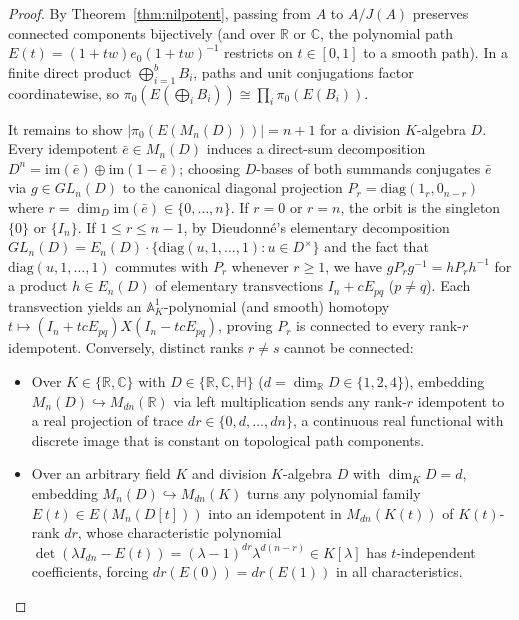 \documentclass[11pt,a4paper]{article}
\theoremstyle{definition}
\newcommand{\R}{\mathbb{R}}
\newcommand{\C}{\mathbb{C}}
\newcommand{\HH}{\mathbb{H}}
\begin{document}
\begin{proof}
By Theorem~\ref{thm:nilpotent}, passing from $A$ to $A/J(A)$ preserves connected components
bijectively (and over $\R$ or $\C$, the polynomial path $E(t)=(1+tw)e_0(1+tw)^{-1}$ restricts
on $t\in[0,1]$ to a smooth path). In a finite direct product $\bigoplus_{i=1}^b B_i$, paths
and unit conjugations factor coordinatewise, so $\pi_0(E(\bigoplus_i B_i))\cong\prod_i\pi_0(E(B_i))$.

It remains to show $|\pi_0(E(M_n(D)))|=n+1$ for a division $K$-algebra $D$. Every idempotent
$\bar e\in M_n(D)$ induces a direct-sum decomposition $D^n = \mathrm{im}(\bar e)\oplus\mathrm{im}(1-\bar e)$;
choosing $D$-bases of both summands conjugates $\bar e$ via $g\in GL_n(D)$ to the canonical
diagonal projection $P_r = \mathrm{diag}(1_r,0_{n-r})$ where $r=\dim_D\mathrm{im}(\bar e)\in\{0,\dots,n\}$.
If $r=0$ or $r=n$, the orbit is the singleton $\{0\}$ or $\{I_n\}$. If $1\le r\le n-1$, by
Dieudonn\'e's elementary decomposition $GL_n(D) = E_n(D)\cdot\{\mathrm{diag}(u,1,\dots,1):u\in D^\times\}$
and the fact that $\mathrm{diag}(u,1,\dots,1)$ commutes with $P_r$ whenever $r\ge 1$, we have
$g P_r g^{-1} = h P_r h^{-1}$ for a product $h\in E_n(D)$ of elementary transvections
$I_n + c E_{pq}$ ($p\ne q$). Each transvection yields an $\mathbb{A}^1_K$-polynomial (and
smooth) homotopy $t\mapsto (I_n + tcE_{pq})X(I_n - tcE_{pq})$, proving $P_r$ is connected to
every rank-$r$ idempotent. Conversely, distinct ranks $r\ne s$ cannot be connected:
\begin{itemize}
  \setlength{\itemsep}{1pt}
  \item Over $K\in\{\R,\C\}$ with $D\in\{\R,\C,\HH\}$ ($d=\dim_\R D\in\{1,2,4\}$), embedding
    $M_n(D)\hookrightarrow M_{dn}(\R)$ via left multiplication sends any rank-$r$ idempotent
    to a real projection of trace $dr\in\{0,d,\dots,dn\}$, a continuous real functional with
    discrete image that is constant on topological path components.
  \item Over an arbitrary field $K$ and division $K$-algebra $D$ with $\dim_K D = d$, embedding
    $M_n(D)\hookrightarrow M_{dn}(K)$ turns any polynomial family $E(t)\in E(M_n(D[t]))$ into
    an idempotent in $M_{dn}(K(t))$ of $K(t)$-rank $dr$, whose characteristic polynomial
    $\det(\lambda I_{dn}-E(t)) = (\lambda-1)^{dr}\lambda^{d(n-r)}\in K[\lambda]$ has
    $t$-independent coefficients, forcing $dr(E(0))=dr(E(1))$ in all characteristics. \qedhere
\end{itemize}
\end{proof}
\end{document}
